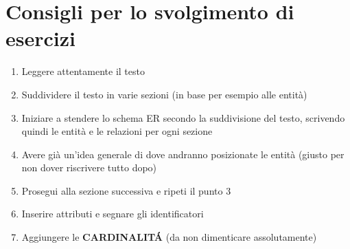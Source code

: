 \section{Consigli per lo svolgimento di esercizi}
\begin{enumerate}
    \item Leggere attentamente il testo
    \item Suddividere il testo in varie sezioni (in base per esempio alle entità)
    \item Iniziare a stendere lo schema ER secondo la suddivisione del testo,
    scrivendo quindi le entità e le relazioni per ogni sezione
    \item Avere già un'idea generale di dove andranno posizionate le entità (giusto
    per non dover riscrivere tutto dopo)
    \item Prosegui alla sezione successiva e ripeti il punto 3
    \item Inserire attributi e segnare gli identificatori
    \item Aggiungere le \textbf{CARDINALIT\'A} (da non dimenticare assolutamente)
\end{enumerate}